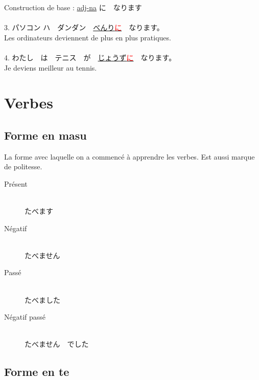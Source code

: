 \documentclass[11pt]{report}
\newenvironment{Japanese}{%
\CJKfamily{min}%
\CJKtilde  
\CJKnospace}{}
\begin{document}
\begin{CJK}{UTF8}{}  
\begin{Japanese}
	Construction de base : \underline{adj-na} に　なります \\ \\
	3. パソコン ハ　ダンダン　\underline{べんり\textcolor{red}{に}}　なります。 \\
	Les ordinateurs deviennent de plus en plus pratiques. \\ \\
	4. わたし　は　テニス　が　\underline{じょうず\textcolor{red}{に}}　なります。 \\
	Je deviens meilleur au tennis.
\end{Japanese}  
\end{CJK}

\chapter{Verbes}

\section{Forme en masu}

\begin{CJK}{UTF8}{}  
\begin{Japanese}
	La forme avec laquelle on a commenc\'e \`a apprendre les verbes. Est aussi marque de politesse. \\
	\begin{description}
		\item[Présent] \hfill \\
		たべます
		\item[Négatif] \hfill \\
		たべません
		\item[Passé] \hfill \\
		たべました
		\item[Négatif passé] \hfill \\
		たべません　でした
	\end{description}
\end{Japanese}  
\end{CJK}

\section{Forme en te}
\end{document}
